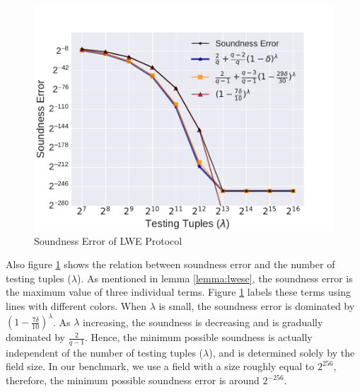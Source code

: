 \begin{figure}[h]
    \centering
    \includegraphics[width=1\textwidth]{graph/se.pdf}
    \caption{Soundness Error of LWE Protocol}
    \label{fig:se}
\end{figure}

Also figure \ref{fig:se} shows the relation between soundness error and the number of testing tuples ($\lambda$). As mentioned in lemma \ref{lemma:lwese}, the soundness error is the maximum value of three individual terms. Figure \ref{fig:se} labels these terms using lines with different colors. When $\lambda$ is small, the soundness error is dominated by $(1 - \frac{7\delta}{10})^\lambda$.
As $\lambda$ increasing, the soundness is decreasing and is gradually dominated by $\frac{2}{q-1}$. Hence, the minimum possible soundness is actually independent of the number of testing tuples ($\lambda$), and is determined solely by the field size. In our benchmark, we use a field with a size roughly equal to $2^{256}$, therefore, the minimum possible soundness error is around $2^{-256}$.

